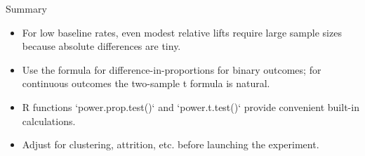 \documentclass[aspectratio=169,11pt]{beamer}
\begin{document}
\begin{frame}{Summary}
  \begin{itemize}
    \item For low baseline rates, even modest relative lifts require large sample sizes because absolute differences are tiny.
    \item Use the formula for difference-in-proportions for binary outcomes; for continuous outcomes the two-sample t formula is natural.
    \item R functions `power.prop.test()` and `power.t.test()` provide convenient built-in calculations.
    \item Adjust for clustering, attrition, etc. before launching the experiment.
  \end{itemize}
\end{frame}







\end{document}

